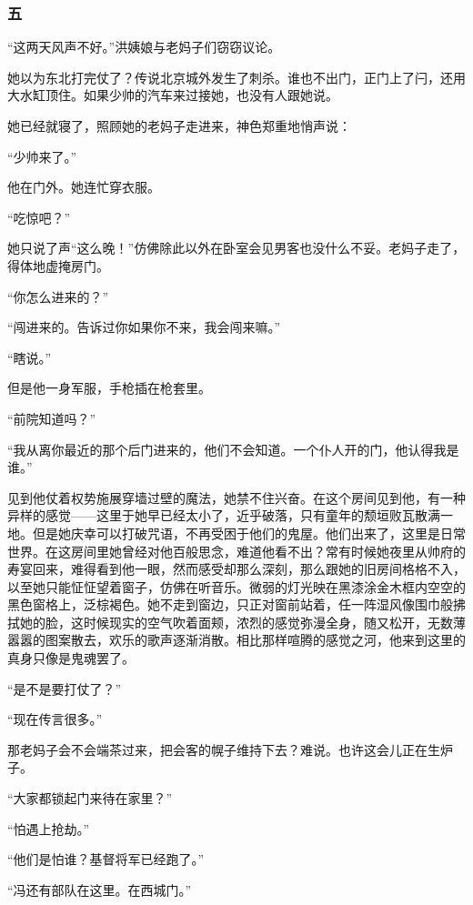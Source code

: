 \subsubsection*{五}


\par “这两天风声不好。”洪姨娘与老妈子们窃窃议论。
\par 她以为东北打完仗了？传说北京城外发生了刺杀。谁也不出门，正门上了闩，还用大水缸顶住。如果少帅的汽车来过接她，也没有人跟她说。
\par 她已经就寝了，照顾她的老妈子走进来，神色郑重地悄声说：
\par “少帅来了。”
\par 他在门外。她连忙穿衣服。
\par “吃惊吧？”
\par 她只说了声“这么晚！”仿佛除此以外在卧室会见男客也没什么不妥。老妈子走了，得体地虚掩房门。
\par “你怎么进来的？”
\par “闯进来的。告诉过你如果你不来，我会闯来嘛。”
\par “瞎说。”
\par 但是他一身军服，手枪插在枪套里。
\par “前院知道吗？”
\par “我从离你最近的那个后门进来的，他们不会知道。一个仆人开的门，他认得我是谁。”
\par 见到他仗着权势施展穿墙过壁的魔法，她禁不住兴奋。在这个房间见到他，有一种异样的感觉——这里于她早已经太小了，近乎破落，只有童年的颓垣败瓦散满一地。但是她庆幸可以打破咒语，不再受困于他们的鬼屋。他们出来了，这里是日常世界。在这房间里她曾经对他百般思念，难道他看不出？常有时候她夜里从帅府的寿宴回来，难得看到他一眼，然而感受却那么深刻，那么跟她的旧房间格格不入，以至她只能怔怔望着窗子，仿佛在听音乐。微弱的灯光映在黑漆涂金木框内空空的黑色窗格上，泛棕褐色。她不走到窗边，只正对窗前站着，任一阵湿风像围巾般拂拭她的脸，这时候现实的空气吹着面颊，浓烈的感觉弥漫全身，随又松开，无数薄嚣嚣的图案散去，欢乐的歌声逐渐消散。相比那样喧腾的感觉之河，他来到这里的真身只像是鬼魂罢了。
\par “是不是要打仗了？”
\par “现在传言很多。”
\par 那老妈子会不会端茶过来，把会客的幌子维持下去？难说。也许这会儿正在生炉子。
\par “大家都锁起门来待在家里？”
\par “怕遇上抢劫。”
\par “他们是怕谁？基督将军已经跑了。”
\par “冯还有部队在这里。在西城门。”
